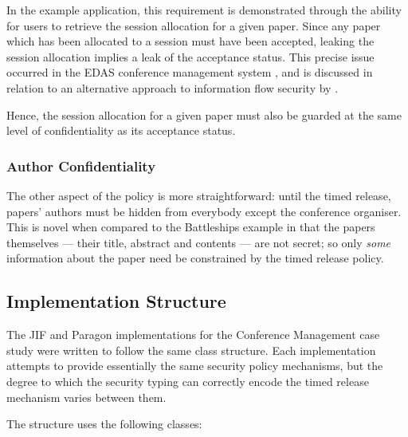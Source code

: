 In the example application, this requirement is demonstrated through the ability for users to retrieve the session allocation for a given paper. Since any paper which has been allocated to a session must have been accepted, leaking the session allocation implies a leak of the acceptance status. This precise issue occurred in the EDAS conference management system \cite{agrawal2016edas_conf}, and is discussed in relation to an alternative approach to information flow security by \citeauthor{polikarpova2016lifty} \cite{polikarpova2016lifty}.

Hence, the session allocation for a given paper must also be guarded at the same level of confidentiality as its acceptance status.

\subsubsection{Author Confidentiality}

The other aspect of the policy is more straightforward: until the timed release, papers' authors must be hidden from everybody except the conference organiser. This is novel when compared to the Battleships example in that the papers themselves --- their title, abstract and contents --- are not secret; so only \textit{some} information about the paper need be constrained by the timed release policy.

\newpage

\subsection{Implementation Structure}

The JIF and Paragon implementations for the Conference Management case study were written to follow the same class structure. Each implementation attempts to provide essentially the same security policy mechanisms, but the degree to which the security typing can correctly encode the timed release mechanism varies between them.

The structure uses the following classes:

